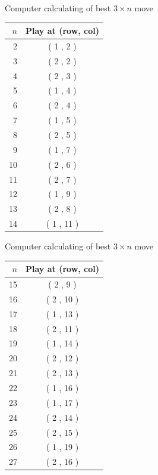 \documentclass{beamer}
\begin{document}
\begin{frame}{Computer calculating of best $3\times n$ move}
\begin{center}
\begin{tabular}{r|c}
\hline
$n$ & Play at (row, col) \\
\hline
2  & ( 1 , 2 ) \\
3  & ( 2 , 2 ) \\
4  & ( 2 , 3 ) \\
5  & ( 1 , 4 ) \\
6  & ( 2 , 4 ) \\
7  & ( 1 , 5 ) \\
8  & ( 2 , 5 ) \\
9  & ( 1 , 7 ) \\
10  & ( 2 , 6 ) \\
11  & ( 2 , 7 ) \\
12  & ( 1 , 9 ) \\
13  & ( 2 , 8 ) \\
14  & ( 1 , 11 ) \\
\end{tabular}
\end{center}
\end{frame}
\begin{frame}{Computer calculating of best $3\times n$ move}
\begin{center}
\begin{tabular}{r|c}
\hline
$n$ & Play at (row, col) \\
\hline
15  & ( 2 , 9 ) \\
16  & ( 2 , 10 ) \\
17  & ( 1 , 13 ) \\
18  & ( 2 , 11 ) \\
19  & ( 1 , 14 ) \\
20  & ( 2 , 12 ) \\
21  & ( 2 , 13 ) \\
22  & ( 1 , 16 ) \\
23  & ( 1 , 17 ) \\
24  & ( 2 , 14 ) \\
25  & ( 2 , 15 ) \\
26  & ( 1 , 19 ) \\
27  & ( 2 , 16 ) \\
\end{tabular}
\end{center}
\end{frame}
\end{document}
